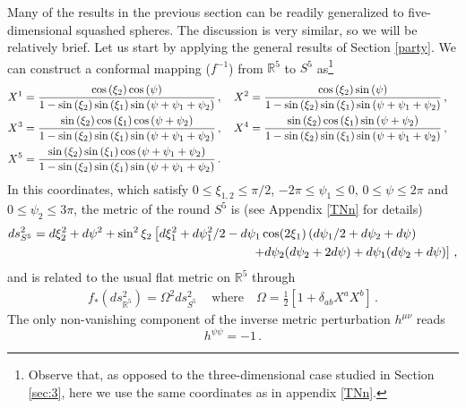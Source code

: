 \documentclass[12pt]{article}
\numberwithin{equation}{section}
\begin{document}
Many of the results in the previous section can be readily generalized to five-dimensional squashed spheres. The discussion is very similar, so we will be relatively brief. Let us start by applying the general results of Section \ref{party}. We can construct a conformal mapping ($f^{-1}$) from $\mathbb{R}^5$ to $S^5$ as\footnote{Observe that, as opposed to the three-dimensional case studied in Section \ref{sec:3}, here we use the same coordinates as in appendix \ref{TNn}.}
%
\begin{align}\notag
X^1&=  \frac{\cos\left(\xi_2 \right)\cos\left(\psi \right)}{1-\sin\left(\xi_2\right)\sin\left(\xi_1\right)\sin\left(\psi+\psi_1+\psi_2\right)}\, ,\quad   
X^2=   \frac{\cos\left(\xi_2 \right)\sin\left(\psi \right)}{1-\sin\left(\xi_2\right)\sin\left(\xi_1\right)\sin\left(\psi+\psi_1+\psi_2\right)}\, , \\ \notag
X^3&=  \frac{\sin\left(\xi_2 \right)\cos\left(\xi_1 \right)\cos\left(\psi+\psi_2\right)}{1-\sin\left(\xi_2\right)\sin\left(\xi_1\right)\sin\left(\psi+\psi_1+\psi_2\right)}\, ,\quad
X^4=    \frac{\sin\left(\xi_2 \right)\cos\left(\xi_1\right)\sin\left(\psi+\psi_2\right)}{1-\sin\left(\xi_2\right)\sin\left(\xi_1\right)\sin\left(\psi+\psi_1+\psi_2\right)}\, ,\quad   \\
X^5&=    \frac{\sin\left(\xi_2 \right)\sin\left(\xi_1 \right)\cos\left(\psi+\psi_1+\psi_2\right)}{1-\sin\left(\xi_2\right)\sin\left(\xi_1\right)\sin\left(\psi+\psi_1+\psi_2\right)}\, .
\end{align}
%
In this coordinates, which satisfy $0\leq\xi_{1,2} \leq \pi/2$, $-2\pi \leq \psi_1 \leq 0$, $0\leq \psi \leq 2\pi$ and $0\leq \psi_2 \leq 3\pi$, the metric of the round $S^5$ is (see Appendix \ref{TNn} for details)
%
\begin{align}\label{sq5}
ds_{S^{5}}^2 =d\xi_2^2+d\psi^2+ \sin ^2\xi_2 &\left[d\xi_1^2+d\psi_1^2/2-d\psi_1 \cos (2 \xi_1) \left(d\psi_1/2 + d\psi_2+d\psi \right)\right. \\ \notag  &\qquad\qquad\qquad\qquad \left.+ d\psi_2 (d\psi_2+2
  d\psi)+d\psi_1 (d\psi_2+
  d\psi)\right]\, ,
\end{align}
%
and is related to the usual flat metric on $\mathbb{R}^5$ through
%
\begin{align}\label{3sphmet}
f_*(ds^2_{\mathbb{R}^5})=\Omega^{2}ds^2 _{S^5}\, \quad \text{where} \quad 
\Omega=\frac{1}{2}\left[1+\delta_{ab}X^aX^b\right]\, .
\end{align}
%
The only non-vanishing component of the inverse metric perturbation $h^{\mu\nu}$ reads
%
\begin{equation}
h^{\psi\psi}=-1\, .
\end{equation}
\end{document}
